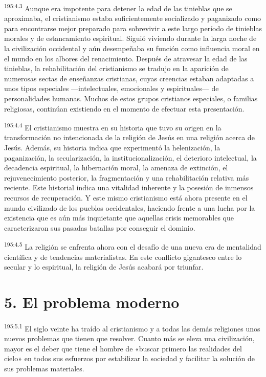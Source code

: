 \par 
\textsuperscript{195:4.3} Aunque era impotente para detener la edad de las tinieblas que se aproximaba, el cristianismo estaba suficientemente socializado y paganizado como para encontrarse mejor preparado para sobrevivir a este largo período de tinieblas morales y de estancamiento espiritual. Siguió viviendo durante la larga noche de la civilización occidental y aún desempeñaba su función como influencia moral en el mundo en los albores del renacimiento. Después de atravesar la edad de las tinieblas, la rehabilitación del cristianismo se tradujo en la aparición de numerosas sectas de enseñanzas cristianas, cuyas creencias estaban adaptadas a unos tipos especiales ---intelectuales, emocionales y espirituales--- de personalidades humanas. Muchos de estos grupos cristianos especiales, o familias religiosas, continúan existiendo en el momento de efectuar esta presentación.

\par 
\textsuperscript{195:4.4} El cristianismo muestra en su historia que tuvo su origen en la transformación no intencionada de la religión de Jesús en una religión acerca de Jesús. Además, su historia indica que experimentó la helenización, la paganización, la secularización, la institucionalización, el deterioro intelectual, la decadencia espiritual, la hibernación moral, la amenaza de extinción, el rejuvenecimiento posterior, la fragmentación y una rehabilitación relativa más reciente. Este historial indica una vitalidad inherente y la posesión de inmensos recursos de recuperación. Y este mismo cristianismo está ahora presente en el mundo civilizado de los pueblos occidentales, haciendo frente a una lucha por la existencia que es aún más inquietante que aquellas crisis memorables que caracterizaron sus pasadas batallas por conseguir el dominio.

\par 
\textsuperscript{195:4.5} La religión se enfrenta ahora con el desafío de una nueva era de mentalidad científica y de tendencias materialistas. En este conflicto gigantesco entre lo secular y lo espiritual, la religión de Jesús acabará por triunfar.

\section*{5. El problema moderno}
\par 
\textsuperscript{195:5.1} El siglo veinte ha traído al cristianismo y a todas las demás religiones unos nuevos problemas que tienen que resolver. Cuanto más se eleva una civilización, mayor es el deber que tiene el hombre de «buscar primero las realidades del cielo» en todos sus esfuerzos por estabilizar la sociedad y facilitar la solución de sus problemas materiales.

